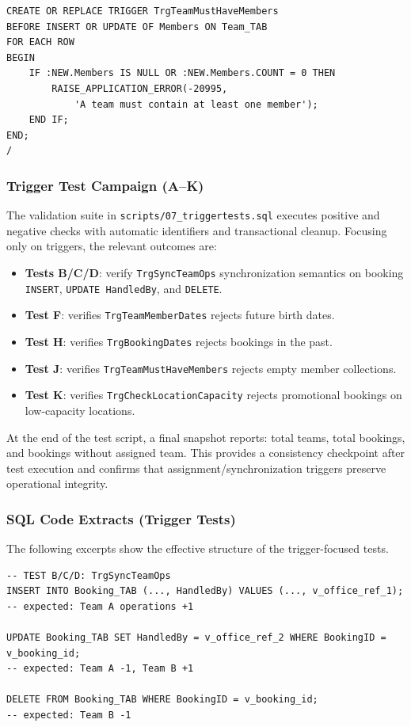 \documentclass[12pt,a4paper]{article}
\begin{document}
\begin{verbatim}
CREATE OR REPLACE TRIGGER TrgTeamMustHaveMembers
BEFORE INSERT OR UPDATE OF Members ON Team_TAB
FOR EACH ROW
BEGIN
    IF :NEW.Members IS NULL OR :NEW.Members.COUNT = 0 THEN
        RAISE_APPLICATION_ERROR(-20995,
            'A team must contain at least one member');
    END IF;
END;
/
\end{verbatim}

\subsubsection*{Trigger Test Campaign (A--K)}
The validation suite in \texttt{scripts/07\_triggertests.sql} executes positive and negative checks with automatic identifiers and transactional cleanup. Focusing only on triggers, the relevant outcomes are:
\begin{itemize}
    \item \textbf{Tests B/C/D}: verify \texttt{TrgSyncTeamOps} synchronization semantics on booking \texttt{INSERT}, \texttt{UPDATE HandledBy}, and \texttt{DELETE}.
    \item \textbf{Test F}: verifies \texttt{TrgTeamMemberDates} rejects future birth dates.
    \item \textbf{Test H}: verifies \texttt{TrgBookingDates} rejects bookings in the past.
    \item \textbf{Test J}: verifies \texttt{TrgTeamMustHaveMembers} rejects empty member collections.
    \item \textbf{Test K}: verifies \texttt{TrgCheckLocationCapacity} rejects promotional bookings on low-capacity locations.
\end{itemize}

At the end of the test script, a final snapshot reports: total teams, total bookings, and bookings without assigned team. This provides a consistency checkpoint after test execution and confirms that assignment/synchronization triggers preserve operational integrity.

\subsubsection*{SQL Code Extracts (Trigger Tests)}
The following excerpts show the effective structure of the trigger-focused tests.

\begin{verbatim}
-- TEST B/C/D: TrgSyncTeamOps
INSERT INTO Booking_TAB (..., HandledBy) VALUES (..., v_office_ref_1);
-- expected: Team A operations +1

UPDATE Booking_TAB SET HandledBy = v_office_ref_2 WHERE BookingID = v_booking_id;
-- expected: Team A -1, Team B +1

DELETE FROM Booking_TAB WHERE BookingID = v_booking_id;
-- expected: Team B -1
\end{verbatim}
\end{document}
